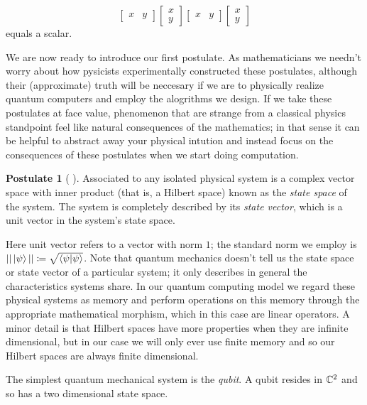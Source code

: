 \documentclass[12pt,twoside]{reedthesis}
\theoremstyle{plain}   %
\theoremstyle{definition}
\newtheorem{post}{Postulate}[section]
\theoremstyle{remark}
\numberwithin{equation}{section}
\begin{document}
  \[
    \begin{bmatrix}
      x & y
    \end{bmatrix}
    \begin{bmatrix}
      x \\ y
    \end{bmatrix}
    \begin{bmatrix}
      x & y
    \end{bmatrix}
    \begin{bmatrix}
      x \\ y
    \end{bmatrix}
  \]
  equals a scalar.
  \par
  We are now ready to introduce our first postulate. As mathematicians we needn't worry about how pysicists experimentally constructed these postulates, although their
  (approximate) truth will be neccesary if we are to physically realize quantum computers and employ the alogrithms we design.
  If we take these postulates at face value, phenomenon that are strange from a classical physics standpoint feel like natural consequences of the mathematics;
  in that sense it can be helpful to abstract away your physical intution and instead focus on the consequences of these postulates when we start doing computation.
  \begin{post}[ {\cite[2.2.1]{nielsen2010}} ]
    Associated to any isolated physical system is a complex vector space
    with inner product (that is, a Hilbert space) known as the \emph{state space} of the
    system. The system is completely described by its \emph{state vector}, which is a unit
    vector in the system's state space.
  \end{post}
  Here unit vector refers to a vector with norm $1$; the standard norm we employ is $|| \ket{\psi} || \coloneq \sqrt{\braket{\psi| \psi}}$.
  Note that quantum mechanics doesn't tell us the state space or state vector of a particular system; it only describes in general the characteristics systems share.
  In our quantum computing model we regard these physical systems as memory and perform operations on this memory through the appropriate mathematical morphism, which in this case are linear operators.
  A minor detail is that Hilbert spaces have more properties when they are infinite dimensional, but in our case we will only ever use finite memory and so our Hilbert spaces are always finite dimensional. \par
  The simplest quantum mechanical system is the \emph{qubit}. A qubit resides in $\mathbb{C}^2$ and so has a two dimensional state space.
\end{document}
